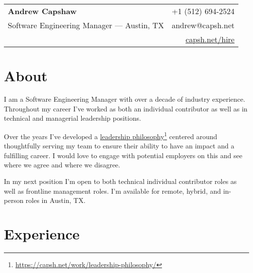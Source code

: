 \documentclass[11pt]{amsart}
\begin{document}
\pagestyle{fancy}

% 
%
\begin{tabularx}{\textwidth}{@{}Xr@{}}
\textbf{Andrew Capshaw} & +1 (512) 694-2524  \\
Software Engineering Manager — Austin, TX & andrew@capsh.net \\
& \href{https://capsh.net/hire}{capsh.net/hire} \\
\end{tabularx}


\section{About}

I am a Software Engineering Manager with over a decade of industry experience. Throughout my career I've worked as both an individual contributor as well as in technical and managerial leadership positions. 

Over the years I've developed a \href{https://capsh.net/work/leadership-philosophy/}{leadership philosophy}\footnote{\url{https://capsh.net/work/leadership-philosophy/}} centered around thoughtfully serving my team to ensure their ability to have an impact and a fulfilling career. I would love to engage with potential employers on this and see where we agree and where we disagree.

In my next position I'm open to both technical individual contributor roles as well as frontline management roles. I'm available for remote, hybrid, and in-person roles in Austin, TX. 

\bigskip
\section{Experience}
\end{document}

